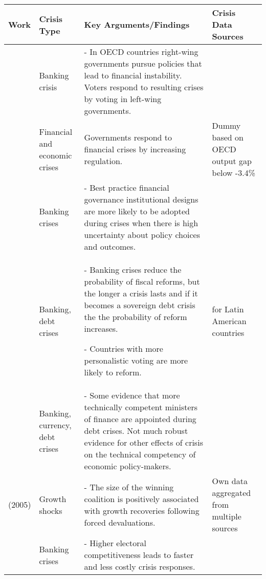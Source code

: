 \begin{tabular}{ m{2.5cm} m{1.75cm} m{6.25cm} m{2.5cm}}
    \hline
    Work & Crisis Type & Key Arguments/Findings & Crisis Data Sources \\
    \hline\hline

    \cite{broz2013} & Banking crisis & - In OECD countries right-wing governments pursue policies that lead to financial instability. Voters respond to resulting crises by voting in left-wing governments. & \cite{Reinhart2009,Laeven2012} \\[0.25cm]\hline

    \cite{galasso2014} & Financial and economic crises & Governments respond to financial crises by increasing regulation. & Dummy based on OECD output gap below -3.4\% \\[0.25cm]\hline

    \cite{Gandrud2013,Gandrud2014} & Banking crises & - Best practice financial governance institutional designs are more likely to be adopted during crises when there is high uncertainty about policy choices and outcomes. & \cite{Laeven2008,ReinhartRog2010} \\[0.25cm]\hline

    \cite{HallerbergScartForthcoming} & Banking, debt crises & - Banking crises reduce the probability of fiscal reforms, but the longer a crisis lasts and if it becomes a sovereign debt crisis the the probability of reform increases.

    - Countries with more personalistic voting are more likely to reform. & \cite{Laeven2012} for Latin American countries \\[0.25cm]\hline

    \cite{Hallerberg2013} & Banking, currency, debt crises & - Some evidence that more technically competent ministers of finance are appointed during debt crises. Not much robust evidence for other effects of crisis on the technical competency of economic policy-makers. & \cite{Laeven2012}  \\[0.25cm]\hline

    \cite{Hicken2005} (2005) & Growth shocks & - The size of the winning coalition is positively associated with growth recoveries following forced devaluations. & Own data aggregated from multiple sources \\[0.25cm]\hline

    \cite{Keefer2007} & Banking crises & - Higher electoral competitiveness leads to faster and less costly crisis responses.


\end{tabular}
